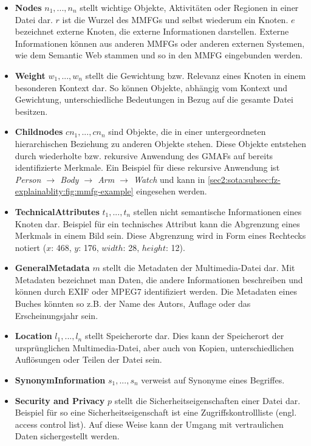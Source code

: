 \begin{itemize}
    \item \textbf{Nodes} $n_{1},...,n_{n}$ stellt wichtige Objekte, Aktivitäten oder Regionen in einer Datei dar. 
    $r$ ist die Wurzel des MMFGs und selbst wiederum ein Knoten.
    $e$ bezeichnet externe Knoten, die externe Informationen darstellen.
    Externe Informationen können aus anderen MMFGs oder anderen externen Systemen, wie dem Semantic Web stammen und so in den MMFG eingebunden werden.
    \item \textbf{Weight} $w_{1},...,w_{n}$ stellt die Gewichtung bzw. Relevanz eines Knoten in einem besonderen Kontext dar. 
    So können Objekte, abhängig vom Kontext und Gewichtung, unterschiedliche Bedeutungen in Bezug auf die gesamte Datei besitzen.
    \item \textbf{Childnodes} $cn_{1},...,cn_{n}$ sind Objekte, die in einer untergeordneten hierarchischen Beziehung zu anderen Objekte stehen.
    Diese Objekte entstehen durch wiederholte bzw. rekursive Anwendung des GMAFs auf bereits identifizierte Merkmale.
    Ein Beispiel für diese rekursive Anwendung ist \textit{Person $\rightarrow$ Body $\rightarrow$ Arm $\rightarrow$ Watch} und kann in \cref{sec2:sota:subsec:fz-explainablity:fig:mmfg-example} eingesehen werden.
    \item \textbf{TechnicalAttributes} $t_{1},...,t_{n}$ stellen nicht semantische Informationen eines Knoten dar.
    Beispiel für ein technisches Attribut kann die Abgrenzung eines Merkmals in einem Bild sein.
    Diese Abgrenzung wird in Form eines Rechtecks notiert ($x$: 468, $y$: 176, $width$: 28, $height$: 12).
    \item \textbf{GeneralMetadata} $m$ stellt die Metadaten der Multimedia-Datei dar. 
    Mit Metadaten bezeichnet man Daten, die andere Informationen beschreiben und können durch EXIF oder MPEG7 identifiziert werden.
    Die Metadaten eines Buches könnten so z.B. der Name des Autors, Auflage oder das Erscheinungsjahr sein.
    \item \textbf{Location} $l_{1},...,l_{n}$ stellt Speicherorte dar.
    Dies kann der Speicherort der ursprünglichen Multimedia-Datei, aber auch von Kopien, unterschiedlichen Auflösungen oder Teilen der Datei sein.
    \item \textbf{SynonymInformation} $s_{1},...,s_{n}$ verweist auf Synonyme eines Begriffes.
    \item \textbf{Security and Privacy} $p$ stellt die Sicherheitseigenschaften einer Datei dar.
    Beispiel für so eine Sicherheitseigenschaft ist eine Zugriffskontrollliste (engl. access control list).
    Auf diese Weise kann der Umgang mit vertraulichen Daten sichergestellt werden.
\end{itemize}
